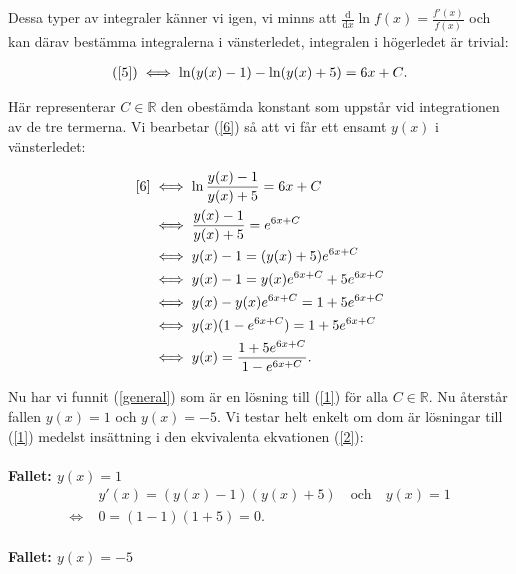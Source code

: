 \documentclass{article}
\begin{document}
\noindent Dessa typer av integraler känner vi igen, vi minns att $\frac{\mathrm{d}}{\mathrm{d}x} \ln f(x) = \frac{f'(x)}{f(x)}$ och kan därav bestämma integralerna i vänsterledet, integralen i högerledet är trivial:

\begin{gather}
  \text{(\ref{5})} \iff \ln(y(x) - 1) - \ln(y(x) + 5) = 6x + C\text{.} \label{6}
\end{gather}

\noindent Här representerar $C \in \mathbb{R}$ den obestämda konstant som uppstår vid integrationen av de tre termerna. Vi bearbetar (\ref{6}) så att vi får ett ensamt $y(x)$ i vänsterledet:

\begin{align}
  \text{\ref{6}} &\iff \ln \frac{y(x) - 1}{y(x) + 5} = 6x + C \notag \\
                 &\iff \frac{y(x) - 1}{y(x) + 5} = e^{6x + C} \notag \\
                 &\iff y(x) - 1 = (y(x) + 5)e^{6x + C} \notag \\
                 &\iff y(x) - 1 = y(x)e^{6x + C} + 5e^{6x + C} \notag \\
                 &\iff y(x) - y(x)e^{6x + C} = 1 + 5e^{6x + C} \notag \\
                 &\iff y(x)(1 - e^{6x + C}) = 1 + 5e^{6x + C} \notag \\
  &\iff y(x) = \frac{1 + 5e^{6x + C}}{1 - e^{6x + C}}\text{.} \label{general}
\end{align}

\noindent Nu har vi funnit (\ref{general}) som är en lösning till (\ref{1}) för alla $C \in \mathbb{R}$. Nu återstår fallen $y(x) = 1$ och $y(x) = -5$. Vi testar helt enkelt om dom är lösningar till (\ref{1}) medelst insättning i den ekvivalenta ekvationen (\ref{2}):
\\
\\
\textbf{Fallet: $y(x) = 1$}
\begin{align*}
  & y'(x) = (y(x) - 1)(y(x) + 5) \quad \text{och} \quad y(x) = 1 \\
  \iff\; & 0 = (1 - 1)(1 + 5) = 0\text{.}
\end{align*}
\\
\textbf{Fallet: $y(x) = - 5$}
\end{document}
